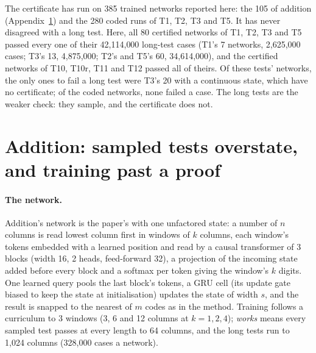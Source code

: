 \documentclass[11pt]{article}
\newcommand{\pn}[2]{#2}
\begin{document}
The certificate has run on \pn{k1.networks}{385} trained networks reported here: the
\pn{addition.networks}{105} of addition (Appendix~\ref{app:addition}) and the \pn{k1.coded}{280}
coded runs of T1, T2, T3 and T5. It has never disagreed with a long test. Here, all
\pn{k1.certified}{80} certified networks of T1, T2, T3 and T5 passed every one of their
\pn{k1.cases}{42{,}114{,}000} long-test cases (T1's \pn{k1.t1-networks}{7} networks,
\pn{k1.t1-cases}{2{,}625{,}000} cases; T3's \pn{k1.t3-networks}{13}, \pn{k1.t3-cases}{4{,}875{,}000};
T2's and T5's \pn{k1.t2-t5-networks}{60}, \pn{k1.t2-t5-cases}{34{,}614{,}000}), and the certified
networks of T10, T10r, T11 and T12 passed all of theirs. Of these tests' networks, the only ones to
fail a long test were T3's \pn{k1.failing-uncoded}{20} with a continuous state, which have no
certificate; of the coded networks, \pn{k1.failing-coded}{none} failed a case. The long tests are the weaker check: they sample, and the certificate does not.

\section{Addition: sampled tests overstate, and training past a proof}
\label{app:addition}

\paragraph{The network.} Addition's network is the paper's with one unfactored state: a number of
$n$ columns is read lowest column first in windows of $k$ columns, each window's tokens embedded
with a learned position and read by a causal transformer of 3 blocks (width 16, 2 heads,
feed-forward 32), a projection of the incoming state added before every block and a softmax per
token giving the window's $k$ digits. One learned query pools the last block's tokens, a GRU cell
(its update gate biased to keep the state at initialisation) updates the state of width $s$, and
the result is snapped to the nearest of $m$ codes as in the method. Training follows a curriculum
to 3 windows (3, 6 and 12 columns at $k = 1, 2, 4$); \emph{works} means every sampled test passes at
every length to 64 columns, and the long tests run to 1{,}024 columns (328{,}000 cases a network).
\end{document}
